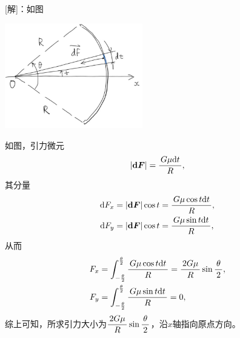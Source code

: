 [解]：如图
\begin{center}
	\includegraphics[width=6cm]{./images/ch6/theSphGr.jpg}
\end{center}
如图，引力微元
$$|\bm{\d F}|=\df{G\mu\d t}R,$$
其分量
\begin{align*}
	\d F_x&=|\bm{\d F}|\cos t=\df{G\mu\cos t\d t}R,\\
	\d F_y&=|\bm{\d F}|\cos t=\df{G\mu\sin t\d t}R,\\
\end{align*}
从而
\begin{align*}
	F_x&=\dint_{-\frac{\theta}2}^{\frac{\theta}2}\df{G\mu\cos t\d t}R
	=\df{2G\mu}{R}\sin\df{\theta}2,\\
	F_y&=\dint_{-\frac{\theta}2}^{\frac{\theta}2}\df{G\mu\sin t\d t}R=0,\\
\end{align*}
综上可知，所求引力大小为$\df{2G\mu}{R}\sin\df{\theta}2$，沿$x$轴指向原点方向。\fin